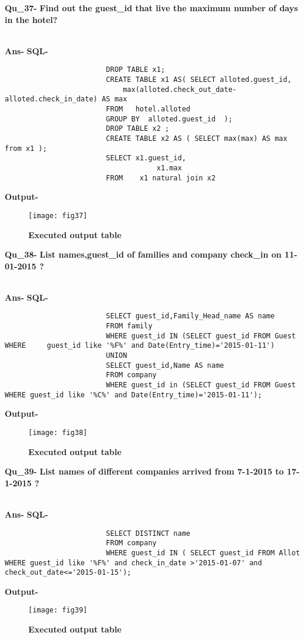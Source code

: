 \documentclass[a4,12pt]{report}
\begin{document}
\textbf{Qu\_37-}  \textbf{Find out the guest\_id that live the maximum number of days in the hotel?} \\\

\textbf{Ans-}		\textbf{SQL-}
\begin{lstlisting}
						DROP TABLE x1;
						CREATE TABLE x1 AS( SELECT alloted.guest_id,
							max(alloted.check_out_date-alloted.check_in_date) AS max
						FROM   hotel.alloted
						GROUP BY  alloted.guest_id	);
						DROP TABLE x2 ;
						CREATE TABLE x2 AS ( SELECT max(max) AS max from x1 );
						SELECT x1.guest_id,
									x1.max
  						FROM    x1 natural join x2
\end{lstlisting}
\textbf{Output-} \\			   
\begin{figure}[hbtp]
\centering
\texttt{[image: fig37]}
\caption{\textbf{{\color{red}Executed output table}}}
\end{figure}






\newpage
\textbf{Qu\_38-}  \textbf{List names,guest\_id of families and company check\_in on 11-01-2015 ?} \\\

\textbf{Ans-}		\textbf{SQL-}
\begin{lstlisting}
						SELECT guest_id,Family_Head_name AS name 
						FROM family 
						WHERE guest_id IN (SELECT guest_id FROM Guest WHERE 	guest_id like '%F%' and Date(Entry_time)='2015-01-11') 
 						UNION 
						SELECT guest_id,Name AS name 
						FROM company 
						WHERE guest_id in (SELECT guest_id FROM Guest WHERE guest_id like '%C%' and Date(Entry_time)='2015-01-11');
\end{lstlisting}
\textbf{Output-} \\			   
\begin{figure}[hbtp]
\centering
\texttt{[image: fig38]}
\caption{\textbf{{\color{red}Executed output table}}}
\end{figure}

\textbf{Qu\_39-}  \textbf{List names of different companies arrived from 7-1-2015 to 17-1-2015 ?} \\\

\textbf{Ans-}		\textbf{SQL-}
\begin{lstlisting}
						SELECT DISTINCT name 
						FROM company 
						WHERE guest_id IN ( SELECT guest_id FROM Allot WHERE guest_id like '%F%' and check_in_date >'2015-01-07' and check_out_date<='2015-01-15'); 
\end{lstlisting}
\textbf{Output-} \\			   
\begin{figure}[hbtp]
\centering
\texttt{[image: fig39]}
\caption{\textbf{{\color{red}Executed output table}}}
\end{figure}
\end{document}

